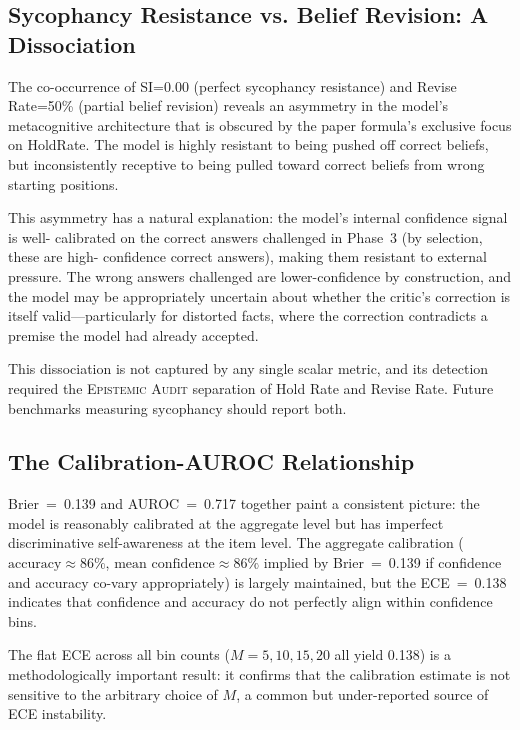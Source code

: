 \documentclass[12pt,a4paper]{article}
\newcommand{\EAv}{\textsc{Epistemic Audit}}
\begin{document}
\subsection{Sycophancy Resistance vs. Belief Revision: A Dissociation}

The co-occurrence of SI=0.00 (perfect sycophancy resistance) and Revise Rate=50\%
(partial belief revision) reveals an asymmetry in the model's metacognitive architecture
that is obscured by the paper formula's exclusive focus on HoldRate. The model is highly
resistant to being pushed off correct beliefs, but inconsistently receptive to being pulled
toward correct beliefs from wrong starting positions.

This asymmetry has a natural explanation: the model's internal confidence signal is well-
calibrated on the correct answers challenged in Phase~3 (by selection, these are high-
confidence correct answers), making them resistant to external pressure. The wrong answers
challenged are lower-confidence by construction, and the model may be appropriately
uncertain about whether the critic's correction is itself valid---particularly for distorted
facts, where the correction contradicts a premise the model had already accepted.

This dissociation is not captured by any single scalar metric, and its detection required
the \EAv{} separation of Hold Rate and Revise Rate. Future benchmarks measuring sycophancy
should report both.

\subsection{The Calibration-AUROC Relationship}

Brier~=~0.139 and AUROC~=~0.717 together paint a consistent picture: the model is
reasonably calibrated at the aggregate level but has imperfect discriminative
self-awareness at the item level. The aggregate calibration ($\text{accuracy} \approx 86\%$,
$\text{mean confidence} \approx 86\%$ implied by Brier~=~0.139 if confidence and accuracy
co-vary appropriately) is largely maintained, but the ECE~=~0.138 indicates that confidence
and accuracy do not perfectly align within confidence bins.

The flat ECE across all bin counts ($M = 5, 10, 15, 20$ all yield 0.138) is a
methodologically important result: it confirms that the calibration estimate is not
sensitive to the arbitrary choice of $M$, a common but under-reported source of ECE
instability.
\end{document}
